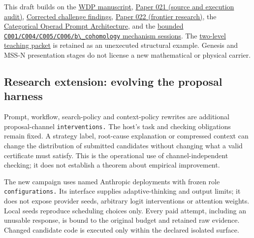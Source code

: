 \documentclass[
  11pt,
]{article}
\newcommand{\passthrough}[1]{#1}
\begin{document}
This draft builds on the
\href{https://github.com/dbccpage/the_symbol_game/blob/59dde95a7860063c25d75db37f40af556e9f28ee/atlas/coda_atlas/F004_papers/001_finite_obstruction_calculus/000_witnessed_difference_programme/witnessed_difference_programme.md}{WDP
manuscript},
\href{https://github.com/dbccpage/the_symbol_game/blob/59dde95a7860063c25d75db37f40af556e9f28ee/atlas/coda_atlas/F004_papers/015_pfp/021_recreated_demos_and_proposal_fidelity_evidence/paper.md}{Paper
021 (source and execution audit)},
\href{https://github.com/dbccpage/the_symbol_game/blob/59dde95a7860063c25d75db37f40af556e9f28ee/atlas/coda_atlas/F004_papers/015_pfp/symbol_game_challenge_and_demos_findings/README.md}{Corrected
challenge findings},
\href{https://github.com/dbccpage/the_symbol_game/blob/59dde95a7860063c25d75db37f40af556e9f28ee/atlas/coda_atlas/F004_papers/015_pfp/022_pfp_frontier_research/paper.md}{Paper
022 (frontier research)}, the
\href{https://github.com/dbccpage/the_symbol_game/blob/59dde95a7860063c25d75db37f40af556e9f28ee/atlas/coda_atlas/prompts/categorical_operad_prompt_architecture.md}{Categorical
Operad Prompt Architecture}, and the
\href{https://github.com/dbccpage/the_symbol_game/blob/59dde95a7860063c25d75db37f40af556e9f28ee/education/documentation/004_oepfp/docs/19_bounded_mechanism_sessions.md}{bounded
\nolinkurl{C001/C004/C005/C006/}\passthrough{\lstinline!b\_cohomology!}
mechanism sessions}. The \href{prompts/example.yaml}{two-level teaching
packet} is retained as an unexecuted structural example. Genesis and
MSS-N presentation stages do not license a new mathematical or physical
carrier.

\subsection{Research extension: evolving the proposal
harness}\label{research-extension-evolving-the-proposal-harness}

Prompt, workflow, search-policy and context-policy rewrites are
additional proposal-channel \nolinkurl{interventions.} The host's task
and checking obligations remain fixed. A strategy label, root-cause
explanation or compressed context can change the distribution of
submitted candidates without changing what a valid certificate must
satisfy. This is the operational use of channel-independent checking; it
does not establish a theorem about empirical improvement.

The new campaign uses named Anthropic deployments with frozen role
\nolinkurl{configurations.} Its interface supplies adaptive-thinking and
output limits; it does not expose provider seeds, arbitrary logit
interventions or attention weights. Local seeds reproduce scheduling
choices only. Every paid attempt, including an unusable response, is
bound to the original budget and retained raw evidence. Changed
candidate code is executed only within the declared isolated surface.
\end{document}
